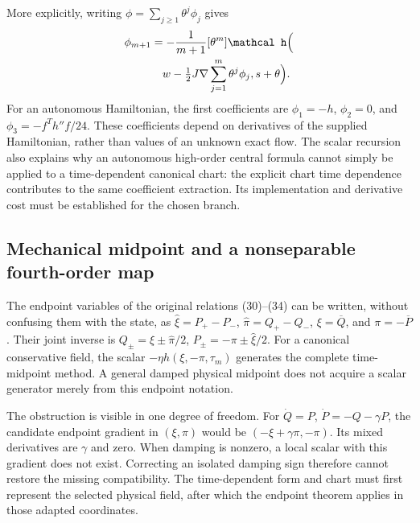 More explicitly, writing $\phi=\sum_{j\ge1}\theta^j\phi_j$ gives
\begin{equation}
 \begin{aligned}
 \phi_{m+1}&=-\frac1{m+1}[\theta^m]\mathcal h\Bigl(\\
 &\quad w-\tfrac12J\nabla\sum_{j=1}^{m}\theta^j\phi_j,s+\theta\Bigr).
\end{aligned}
 \label{eq:th-scalar-recursion}
\end{equation}
For an autonomous Hamiltonian, the first coefficients are $\phi_1=-h$, $\phi_2=0$, and $\phi_3=-f^Th''f/24$. These coefficients depend on derivatives of the supplied Hamiltonian, rather than values of an unknown exact flow. The scalar recursion also explains why an autonomous high-order central formula cannot simply be applied to a time-dependent canonical chart: the explicit chart time dependence contributes to the same coefficient extraction. Its implementation and derivative cost must be established for the chosen branch.

\subsection{Mechanical midpoint and a nonseparable fourth-order map}
The endpoint variables of the original relations (30)--(34) can be written, without confusing them with the state, as $\widehat\xi=P_+-P_-$, $\widehat\pi=Q_+-Q_-$, $\xi=\overline Q$, and $\pi=-\overline P$. Their joint inverse is $Q_\pm=\xi\pm\widehat\pi/2$, $P_\pm=-\pi\pm\widehat\xi/2$. For a canonical conservative field, the scalar $-\eta h(\xi,-\pi,\tau_m)$ generates the complete time-midpoint method. A general damped physical midpoint does not acquire a scalar generator merely from this endpoint notation.

The obstruction is visible in one degree of freedom. For $\dot Q=P$, $\dot P=-Q-\gamma P$, the candidate endpoint gradient in $(\xi,\pi)$ would be $(-\xi+\gamma\pi,-\pi)$. Its mixed derivatives are $\gamma$ and zero. When damping is nonzero, a local scalar with this gradient does not exist. Correcting an isolated damping sign therefore cannot restore the missing compatibility. The time-dependent form and chart must first represent the selected physical field, after which the endpoint theorem applies in those adapted coordinates.


